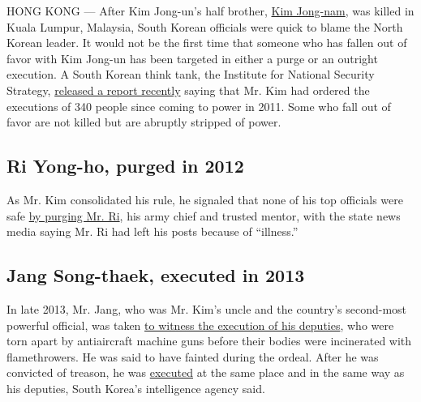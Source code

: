 HONG KONG --- After Kim Jong-un's half brother,
\href{https://www.nytimes.com/2017/02/14/world/asia/kim-jong-un-brother-killed-malaysia.html?ref=asia}{Kim
Jong-nam}, was killed in Kuala Lumpur, Malaysia, South Korean officials
were quick to blame the North Korean leader. It would not be the first
time that someone who has fallen out of favor with Kim Jong-un has been
targeted in either a purge or an outright execution. A South Korean
think tank, the Institute for National Security Strategy,
\href{http://www.cnn.com/2016/12/29/asia/kim-jong-un-executions/}{released
a report recently} saying that Mr. Kim had ordered the executions of 340
people since coming to power in 2011. Some who fall out of favor are not
killed but are abruptly stripped of power.

\hypertarget{ri-yong-ho-purged-in-2012}{%
\subsection{\texorpdfstring{\textbf{Ri Yong-ho, purged in
2012}}{Ri Yong-ho, purged in 2012}}\label{ri-yong-ho-purged-in-2012}}

As Mr. Kim consolidated his rule, he signaled that none of his top
officials were safe
\href{http://www.nytimes.com/2012/07/17/world/asia/north-korea-removes-its-army-chief-from-all-his-posts.html}{by
purging Mr. Ri}, his army chief and trusted mentor, with the state news
media saying Mr. Ri had left his posts because of ``illness.''

\hypertarget{jang-song-thaek-executed-in-2013}{%
\subsection{\texorpdfstring{\textbf{Jang Song-thaek, executed in
2013}}{Jang Song-thaek, executed in 2013}}\label{jang-song-thaek-executed-in-2013}}

In late 2013, Mr. Jang, who was Mr. Kim's uncle and the country's
second-most powerful official, was taken
\href{https://www.nytimes.com/2016/03/13/world/asia/north-korea-executions-jang-song-thaek.html}{to
witness the execution of his deputies}, who were torn apart by
antiaircraft machine guns before their bodies were incinerated with
flamethrowers. He was said to have fainted during the ordeal. After he
was convicted of treason, he was
\href{http://www.nytimes.com/2013/12/13/world/asia/north-korea-says-uncle-of-executed.html?_r=0}{executed}
at the same place and in the same way as his deputies, South Korea's
intelligence agency said.


